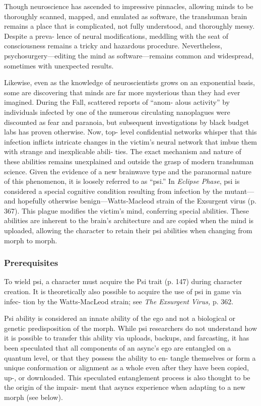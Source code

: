 

Though neuroscience has ascended to impressive 
pinnacles, allowing minds to be thoroughly scanned, 
mapped, and emulated as software, the transhuman 
brain remains a place that is complicated, not fully 
understood, and thoroughly messy. Despite a preva-
lence of neural modifications, meddling with the seat 
of consciousness remains a tricky and hazardous 
procedure. Nevertheless, psychosurgery—editing the 
mind as software—remains common and widespread, 
sometimes with unexpected results.

Likewise, even as the knowledge of neuroscientists 
grows on an exponential basis, some are discovering 
that minds are far more mysterious than they had ever 
imagined. During the Fall, scattered reports of ``anom-
alous activity'' by individuals infected by one of the 
numerous circulating nanoplagues were discounted 
as fear and paranoia, but subsequent investigations 
by black budget labs has proven otherwise. Now, top-
level confidential networks whisper that this infection 
inflicts intricate changes in the victim's neural network 
that imbue them with strange and inexplicable abili-
ties. The exact mechanism and nature of these abilities 
remains unexplained and outside the grasp of modern 
transhuman science. Given the evidence of a new 
brainwave type and the paranormal nature of this 
phenomenon, it is loosely referred to as ``psi.''
In \textit{Eclipse Phase}, psi is considered a special cognitive 
condition resulting from infection by the mutant—and 
hopefully otherwise benign—Watts-Macleod strain 
of the Exsurgent virus (p. 367). This plague modifies 
the victim's mind, conferring special abilities. These 
abilities are inherent to the brain's architecture and 
are copied when the mind is uploaded, allowing the 
character to retain their psi abilities when changing 
from morph to morph.

\subsubsection{Prerequisites}

To wield psi, a character must acquire the Psi trait (p. 
147) during character creation. It is theoretically also 
possible to acquire the use of psi in game via infec-
tion by the Watts-MacLeod strain; see \textit{The Exsurgent }
\textit{Virus,} p. 362.

Psi ability is considered an innate ability of the 
ego and not a biological or genetic predisposition of 
the morph. While psi researchers do not understand 
how it is possible to transfer this ability via uploads, 
backups, and farcasting, it has been speculated that 
all components of an async's ego are entangled on a 
quantum level, or that they possess the ability to en-
tangle themselves or form a unique conformation or 
alignment as a whole even after they have been copied, 
up-, or downloaded. This speculated entanglement 
process is also thought to be the origin of the impair-
ment that asyncs experience when adapting to a new 
morph (see below).

